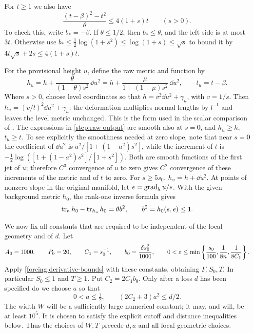 For $t\ge1$ we also have
\begin{equation}\label{step:beta-budget}
 \frac{(t-\beta)^2-t^2}{\theta}\le4(1+s)t\qquad(s>0).
\end{equation}
To check this, write $b_*=-\beta$.  If $\theta\le1/2$, then
$b_*\le\theta$, and the left side is at most $3t$.  Otherwise use
$b_*\le\tfrac12\log(1+s^2)\le\log(1+s)\le\sqrt s$ to bound it by
$4t\sqrt s+2s\le4(1+s)t$.

For the provisional height $u$, define the raw metric and function by
\begin{equation}\label{step:raw-output}
 h_u=h+\frac{\theta}{(1-\theta)s^2}\,\dd u^2
     =h+\frac{\mu}{1+(1-\mu)s^2}\,\dd u^2,
 \qquad t_u=t-\beta.
\end{equation}
Where $s>0$, choose level coordinates so that
$h=v^2\dd u^2+\gamma_u$, with $v=1/s$. Then
$h_u=(v/l)^2\dd u^2+\gamma_u$: the deformation multiplies normal
lengths by $l^{-1}$ and leaves the level metric unchanged. This is the
form used in the scalar comparison of .
The expressions in \eqref{step:raw-output} are smooth also at $s=0$,
and $h_u\ge h$, $t_u\ge t$.
To see explicitly the smoothness needed at zero slope, note that near $s=0$
the coefficient of $\dd u^2$ is
$a^2/[1+(1-a^2)s^2]$, while the increment of $t$ is
$-\tfrac12\log([1+(1-a^2)s^2]/[1+s^2])$.
Both are smooth functions of the first jet of $u$; therefore
$C^3$ convergence of $u$ to zero gives $C^2$ convergence of these
increments of the metric and of \(t\) to zero.
For $s\ge5s_0$, $h_u=h+\dd u^2$.  At points of nonzero slope in the original manifold, let
$e=\operatorname{grad}_hu/s$. With the given background metric $h_0$, the rank-one
inverse formula gives
\begin{equation}\label{step:trace}
 \operatorname{tr}_hh_0-\operatorname{tr}_{h_u}h_0=\theta b^2,
 \qquad b^2=h_0(e,e)\le1.
\end{equation}

We now fix all constants that are required to be independent of the local
geometry and of $d$.  Let
\begin{equation}\label{step:constants}
 A_0=1000,\qquad P_0=20,\qquad C_1=s_0^{-1},\qquad
 b_0=\frac{\delta s_0^2}{1000},\qquad
 0<\varepsilon\le\min\left\{\frac{s_0}{100},\frac1{8n},\frac1{8C_1}\right\}.
\end{equation}
Apply \cref{forcing:derivative-bounds} with these constants, obtaining $F,S_0,T$.
In particular $S_0\le1$ and $T\ge1$.  Put $C_2=2C_1b_0$.
Only after a loss $d$ has been specified do we choose $a$ so that
\begin{equation}\label{step:a-choice}
 0<a\le\tfrac12,\qquad (2C_2+3)a^2\le d/2.
\end{equation}
The width $W$ will be a sufficiently large numerical constant; it may,
and will, be at least $10^5$.  It is chosen to satisfy the explicit
cutoff and distance inequalities below.  Thus the choices of $W,T$
precede $d,a$ and all local geometric choices.

